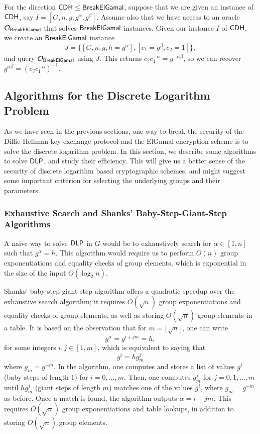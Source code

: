 For the direction ${\sf CDH} \leq {\sf BreakElGamal}$, suppose that we are given an 
instance of ${\sf CDH}$, say $I = [G, n, g, g^\alpha, g^\beta]$. Assume also that 
we have access to an oracle ${\cal O}_{{\sf BreakElGamal}}$ that solves 
${\sf BreakElGamal}$ instances. Given our instance $I$ of ${\sf CDH}$, we create an 
${\sf BreakElGamal}$ instance 
\[ J = \{[G, n, g, h = g^\alpha], [c_1 = g^\beta, c_2 = 1]\}, \] 
and query ${\cal O}_{{\sf BreakElGamal}}$ using $J$. This returns $c_2c_1^{-\alpha} 
= g^{-\alpha\beta}$, so we can recover $g^{\alpha\beta} = (c_2c_1^{-\alpha})^{-1}$. 

\subsection{Algorithms for the Discrete Logarithm Problem}
As we have seen in the previous sections, one way to break the security of the 
Diffie-Hellman key exchange protocol and the ElGamal encryption scheme is to solve 
the discrete logarithm problem. In this section, we describe some algorithms to 
solve ${\sf DLP}$, and study their efficiency. This will give us a better sense of the 
security of discrete logarithm based cryptographic schemes, and might suggest some 
important criterion for selecting the underlying groups and their parameters.

\subsubsection{Exhaustive Search and Shanks' Baby-Step-Giant-Step Algorithms}
A naive way to solve ${\sf DLP}$ in $G$ would be to exhaustively search for $\alpha
\in [1, n]$ such that $g^\alpha = h$. This algorithm would require us to perform 
$O(n)$ group exponentiations and equality checks of group elements, which is 
exponential in the size of the input $O(\log_2 n)$.

Shanks' baby-step-giant-step algorithm offers a quadratic speedup over the 
exhaustive search algorithm; it requires $O(\sqrt{n})$ group exponentiations 
and equality checks of group elements, as well as storing $O(\sqrt{n})$ 
group elements in a table. It is based on the observation that for 
$m = \lfloor{\sqrt n}\rfloor$, one can write 
\[ g^\alpha = g^{i+jm} = h, \] 
for some integers $i, j \in [1, m]$, which is equivalent to saying that 
\[ g^i = hg_m^j \] 
where $g_m = g^{-m}$. In the algorithm, one computes and stores a list of 
values $g^i$ (baby steps of length $1$) for $i = 0, \dots, m$. Then, one 
computes $g_m^j$ for $j = 0, 1, \dots, m$ until $hg_m^j$ (giant steps of 
length $m$) matches one of the values $g^i$, where $g_m = g^{-m}$ as before. 
Once a match is found, the algorithm outputs $\alpha = i + jm$. This 
requires $O(\sqrt n)$ group exponentiations and table lookups, in addition 
to storing $O(\sqrt n)$ group elements. 

